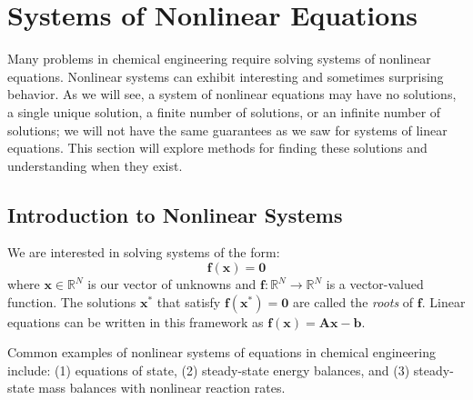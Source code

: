 \chapter{Systems of Nonlinear Equations}
Many problems in chemical engineering require solving systems of nonlinear equations. Nonlinear systems can exhibit interesting and sometimes surprising behavior. As we will see, a system of nonlinear equations may have no solutions, a single unique solution, a finite number of solutions, or an infinite number of solutions; we will not have the same guarantees as we saw for systems of linear equations. This section will explore methods for finding these solutions and understanding when they exist.

\section{Introduction to Nonlinear Systems}

We are interested in solving systems of the form:
\begin{equation}
\mathbf{f}(\mathbf{x}) = \mathbf{0}
\end{equation}
where $\mathbf{x} \in \mathbb{R}^N$ is our vector of unknowns and $\mathbf{f}: \mathbb{R}^N \rightarrow \mathbb{R}^N$ is a vector-valued function. The solutions $\mathbf{x}^*$ that satisfy $\mathbf{f}(\mathbf{x}^*) = \mathbf{0}$ are called the \textit{roots} of $\mathbf{f}$. Linear equations can be written in this framework as $\mathbf{f}(\mathbf{x}) = \mathbf{A}\mathbf{x} - \mathbf{b}$. 

Common examples of nonlinear systems of equations in chemical engineering include: (1) equations of state, (2) steady-state energy balances, and (3) steady-state mass balances with nonlinear reaction rates.

